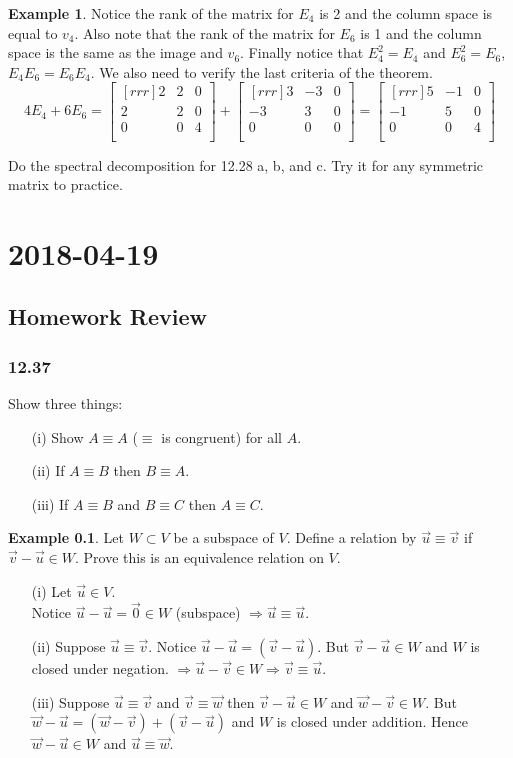 \documentclass{report}
\theoremstyle{plain}
\theoremstyle{definition}
\newtheorem*{ex}{Example}
\theoremstyle{plain}
\newcommand{\mychapter}[2]{
	\setcounter{chapter}{#1}
	\setcounter{section}{0}
	\chapter*{#2}
	\addcontentsline{toc}{chapter}{#2}
}
\begin{document}
\begin{ex}
Notice the rank of the matrix for $E_4$ is 2 and the column space is equal to $v_4$. Also note that the rank of the matrix for $E_6$ is 1 and the column space is the same as the image and $v_6$. Finally notice that $E_4^2=E_4$ and $E_6^2=E_6$, $E_4E_6=E_6E_4$. We also need to verify the last criteria of the theorem.
\[ 4E_4+6E_6 = \begin{bmatrix}[rrr]2&2&0\\2&2&0\\0&0&4\\\end{bmatrix}+\begin{bmatrix}[rrr]3&-3&0\\-3&3&0\\0&0&0\\\end{bmatrix} = \begin{bmatrix}[rrr]5&-1&0\\-1&5&0\\0&0&4\\\end{bmatrix} \]
\end{ex}
Do the spectral decomposition for 12.28 a, b, and c. Try it for any symmetric matrix to practice.


\mychapter{42}{2018-04-19}
\section{Homework Review}
\subsection{12.37}
Show three things:
\begin{enumerate}
\item[(i)] Show $A\equiv A$ ($\equiv$ is congruent) for all $A$.
\item[(ii)] If $A\equiv B$ then $B\equiv A$.
\item[(iii)] If $A\equiv B$ and $B\equiv C$ then $A\equiv C$.
\end{enumerate}
\begin{ex}
Let $W\subset V$ be a subspace of $V$. Define a relation by $\vec{u}\equiv\vec{v}$ if $\vec{v}-\vec{u}\in W$. Prove this is an equivalence relation on $V$.
\begin{enumerate}
\item[(i)]Let $\vec{u}\in V$.\\
Notice $\vec{u}-\vec{u}=\vec{0}\in W$ (subspace) $\Rightarrow \vec{u}\equiv \vec{u}$.
\item[(ii)]Suppose $\vec{u}\equiv\vec{v}$. Notice $\vec{u}-\vec{u}=(\vec{v}-\vec{u})$. But $\vec{v}-\vec{u}\in W$ and $W$ is closed under negation. $\Rightarrow \vec{u}-\vec{v}\in W \Rightarrow \vec{v}\equiv \vec{u}$.
\item[(iii)]Suppose $\vec{u}\equiv \vec{v}$ and $\vec{v}\equiv\vec{w}$ then $\vec{v}-\vec{u}\in W$ and $\vec{w}-\vec{v}\in W$. But $\vec{w}-\vec{u} = (\vec{w}-\vec{v})+(\vec{v}-\vec{u})$ and $W$ is closed under addition. Hence $\vec{w}-\vec{u}\in W$ and $\vec{u}\equiv\vec{w}$.
\end{enumerate}
\end{ex}
\end{document}
